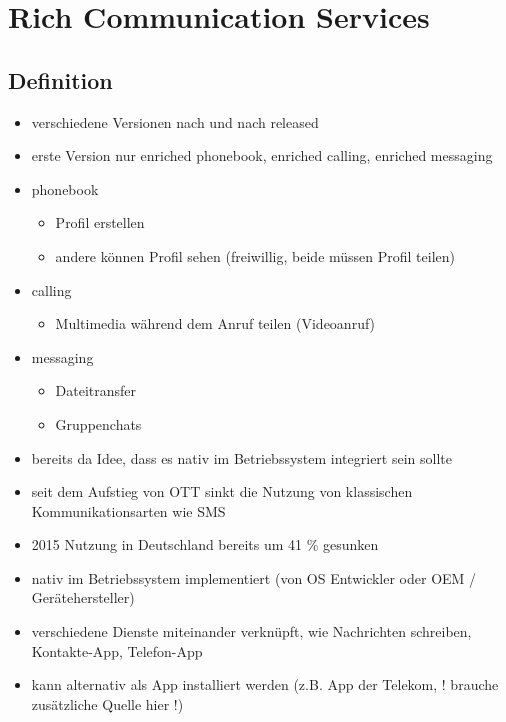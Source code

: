 \documentclass[conference]{IEEEtran}
\begin{document}
\section{Rich Communication Services}

\subsection{Definition}

\begin{itemize}
    \item verschiedene Versionen nach und nach released
    \item erste Version nur enriched phonebook, enriched calling, enriched messaging
    \item phonebook
          \begin{itemize}
              \item Profil erstellen
              \item andere können Profil sehen (freiwillig, beide müssen Profil teilen)
          \end{itemize}
    \item calling
          \begin{itemize}
              \item Multimedia während dem Anruf teilen (Videoanruf)
          \end{itemize}
    \item messaging
          \begin{itemize}
              \item Dateitransfer
              \item Gruppenchats
          \end{itemize}
    \item bereits da Idee, dass es nativ im Betriebssystem integriert sein sollte
\end{itemize}
\cite{rcsuite}

\begin{itemize}
    \item seit dem Aufstieg von OTT sinkt die Nutzung von klassischen Kommunikationsarten wie SMS
    \item 2015 Nutzung in Deutschland bereits um 41 \% gesunken
\end{itemize}
\cite{ottmobinter}

\begin{itemize}
    \item nativ im Betriebssystem implementiert (von OS Entwickler oder OEM / Gerätehersteller)
    \item verschiedene Dienste miteinander verknüpft, wie Nachrichten schreiben, Kontakte-App, Telefon-App
    \item kann alternativ als App installiert werden (z.B. App der Telekom, ! brauche zusätzliche Quelle hier !)
\end{itemize}
\cite{uniprof}
\end{document}
